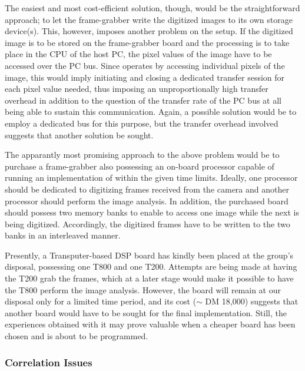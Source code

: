 The easiest and most cost-efficient solution, though, would be the
straightforward approach; to let the frame-grabber write the digitized
images to its own storage device(s).  This, however, imposes another
problem on the setup.  If the digitized image is to be stored on the
frame-grabber board and the processing is to take place in the CPU of
the host PC, the pixel values of the image have to be accessed over
the PC bus.  Since {\octopus} operates by accessing individual pixels
of the image, this would imply initiating and closing a dedicated
transfer session for each pixel value needed, thus imposing an
unproportionally high transfer overhead in addition to the question
of the transfer rate of the PC bus at all being able to sustain this
communication.  Again, a possible solution would be to employ a
dedicated bus for this purpose, but the transfer overhead involved
suggests that another solution be sought.

The apparantly most promising approach to the above problem would be
to purchase a frame-grabber also possessing an on-board processor
capable of running an implementation of {\octopus} within the given
time limits.  Ideally, one processor should be dedicated to digitizing
frames received from the camera and another processor should perform
the image analysis.  In addition, the purchased board should possess
two memory banks to enable {\octopus} to access one image while the
next is being digitized.  Accordingly, the digitized frames have to be
written to the two banks in an interleaved manner.  

Presently, a Transputer-based DSP board has kindly been placed at the
group's disposal, possessing one T800 and one T200.  Attempts are
being made at having the T200 grab the frames, which at a later stage
would make it possible to have the T800 perform the image analysis.
However, the board will remain at our disposal only for a limited time
period, and its cost ($\sim$ DM 18,000) suggests that another board
would have to be sought for the final implementation.  Still, the
experiences obtained with it may prove valuable when a cheaper board
has been chosen and is about to be programmed.

\subsubsection{Correlation Issues}

